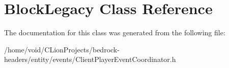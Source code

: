 \hypertarget{class_block_legacy}{}\section{Block\+Legacy Class Reference}
\label{class_block_legacy}


The documentation for this class was generated from the following file\+:\begin{DoxyCompactItemize}
\item 
/home/void/\+C\+Lion\+Projects/bedrock-\/headers/entity/events/Client\+Player\+Event\+Coordinator.\+h\end{DoxyCompactItemize}
